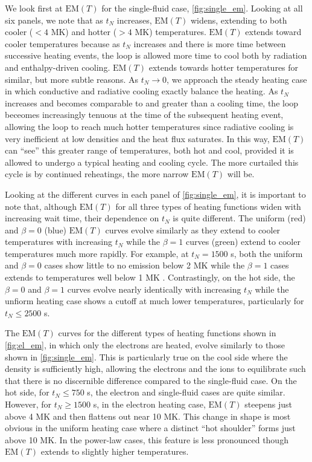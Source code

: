 \documentclass[apj]{emulateapj}
\begin{document}
	\par We look first at $\mathrm{EM}(T)$ for the single-fluid case, \autoref{fig:single_em}. Looking at all six panels, we note that as $t_N$ increases, $\mathrm{EM}(T)$ widens, extending to both cooler ($<4$ MK) and hotter ($>4$ MK) temperatures. $\mathrm{EM}(T)$ extends toward cooler temperatures because as $t_N$ increases and there is more time between successive heating events, the loop is allowed more time to cool both by radiation and enthalpy-driven cooling. $\mathrm{EM}(T)$ extends towards hotter temperatures for similar, but more subtle reasons. As $t_N\to0$, we approach the steady heating case in which conductive and radiative cooling exactly balance the heating. As $t_N$ increases and becomes comparable to and greater than a cooling time, the loop beceomes increasingly tenuous at the time of the subsequent heating event, allowing the loop to reach much hotter temperatures since radiative cooling is very inefficient at low densities and the heat flux saturates. In this way, $\mathrm{EM}(T)$ can ``see'' this greater range of temperatures, both hot and cool, provided it is allowed to undergo a typical heating and cooling cycle. The more curtailed this cycle is by continued reheatings, the more narrow $\mathrm{EM}(T)$ will be.
	\par Looking at the different curves in each panel of \autoref{fig:single_em}, it is important to note that, although $\mathrm{EM}(T)$ for all three types of heating functions widen with increasing wait time, their dependence on $t_N$ is quite different. The uniform (red) and $\beta=0$ (blue) $\mathrm{EM}(T)$ curves evolve similarly as they extend to cooler temperatures with increasing $t_N$ while the $\beta=1$ curves (green) extend to cooler temperatures much more rapidly. For example, at $t_N=1500$ s, both the uniform and $\beta=0$ cases show little to no emission below 2 MK while the $\beta=1$ cases extends to temperatures well below 1 MK \citep{cargill_active_2014}. Contrastingly, on the hot side, the $\beta=0$ and $\beta=1$ curves evolve nearly identically with increasing $t_N$ while the unfiorm heating case shows a cutoff at much lower temperatures, particularly for $t_N\le2500$ s. 
	\par The $\mathrm{EM}(T)$ curves for the different types of heating functions shown in \autoref{fig:el_em}, in which only the electrons are heated, evolve similarly to those shown in \autoref{fig:single_em}. This is particularly true on the cool side where the density is sufficiently high, allowing the electrons and the ions to equilibrate such that there is no discernible difference compared to the single-fluid case. On the hot side, for $t_N\le750$ s, the electron and single-fluid cases are quite similar. However, for $t_N\ge1500$ s, in the electron heating case, $\mathrm{EM}(T)$ steepens just above 4 MK and then flattens out near 10 MK. This change in shape is most obvious in the uniform heating case where a distinct ``hot shoulder'' forms just above 10 MK. In the power-law cases, this feature is less pronounced though $\mathrm{EM}(T)$ extends to slightly higher temperatures.
\end{document}
